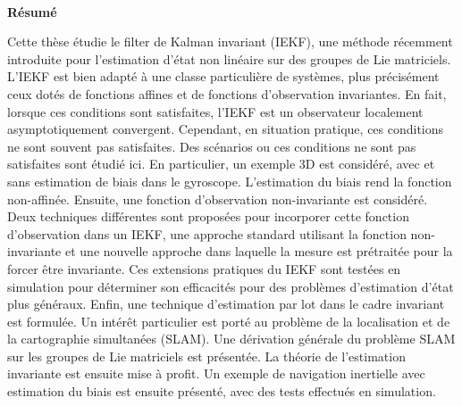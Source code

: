\newpage
{}
\hbox{ }
\twoinmar
{}
\centerline{\large\bf R\'esum\'e}
\vspace{0.7in}
\onehalfspacing
Cette thèse étudie le filter de Kalman invariant (IEKF), une méthode récemment introduite pour l'estimation d'état non linéaire sur des groupes de Lie matriciels. L'IEKF est bien adapté à une classe particulière de systèmes, plus précisément ceux dotés de fonctions affines et de fonctions d'observation invariantes. En fait, lorsque ces conditions sont satisfaites, l'IEKF est un observateur localement asymptotiquement convergent. Cependant, en situation pratique, ces conditions ne sont souvent pas satisfaites. Des scénarios ou ces conditions ne sont pas satisfaites sont étudié ici. En particulier, un exemple 3D est considéré, avec et sans estimation de biais dans le gyroscope. L'estimation du biais rend la fonction  non-affinée. Ensuite, une fonction d'observation non-invariante est considéré. Deux techniques différentes sont proposées pour incorporer cette fonction d'observation dans un IEKF, une approche standard utilisant la fonction non-invariante et une nouvelle approche dans laquelle la mesure est prétraitée pour la forcer être invariante. Ces extensions pratiques du IEKF sont testées en simulation pour déterminer son efficacités pour des problèmes d'estimation d'état plus généraux. Enfin, une technique d'estimation par lot dans le cadre invariant est formulée. Un intérêt particulier est porté au problème de la localisation et de la cartographie simultanées (SLAM). Une dérivation générale du problème SLAM sur les groupes de Lie matriciels est présentée. La théorie de l'estimation invariante est ensuite mise à profit. Un exemple de navigation inertielle avec estimation du biais est ensuite présenté, avec des tests effectués en simulation.

